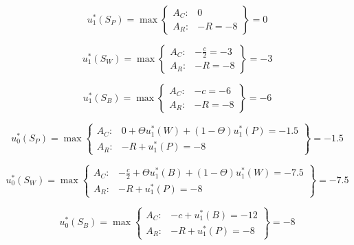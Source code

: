 \documentclass{article}
\begin{document}
\begin{equation}
    u_{1}^{*}(S_P) = \max
    \left\{\begin{matrix}
    A_C: & 0 \\
    A_R: & -R = -8
    \end{matrix}\right\}
    = 0
\end{equation}

\begin{equation}
    u_{1}^{*}(S_W) = \max
    \left\{\begin{matrix}
    A_C: & -\frac{c}{2} = -3 \\
    A_R: & -R = -8
    \end{matrix}\right\}
    = -3
\end{equation}


\begin{equation}
    u_{1}^{*}(S_B) = \max
    \left\{\begin{matrix}
    A_C: & -c = -6\\
    A_R: & -R = -8
    \end{matrix}\right\}
    = -6
\end{equation}


\begin{equation}
    u_{0}^{*}(S_P) = \max
    \left\{\begin{matrix}
    A_C: & 0 + \Theta u_{1}^{*}(W) + (1 - \Theta)u_{1}^{*}(P) = -1.5 \\
    A_R: & -R + u_{1}^{*}(P) = -8
    \end{matrix}\right\}
    = -1.5
\end{equation}

\begin{equation}
    u_{0}^{*}(S_W) = \max
    \left\{\begin{matrix}
    A_C: & -\frac{c}{2} + \Theta u_{1}^{*}(B) + (1 - \Theta)u_{1}^{*}(W) = -7.5\\
    A_R: & -R +  u_{1}^{*}(P) = -8
    \end{matrix}\right\}
    = -7.5
\end{equation}

\begin{equation}
    u_{0}^{*}(S_B) = \max
    \left\{\begin{matrix}
    A_C: & -c + u_{1}^{*}(B) = -12\\
    A_R: & -R + u_{1}^{*}(P) = -8
    \end{matrix}\right\}
    = -8
\end{equation}
\end{document}
